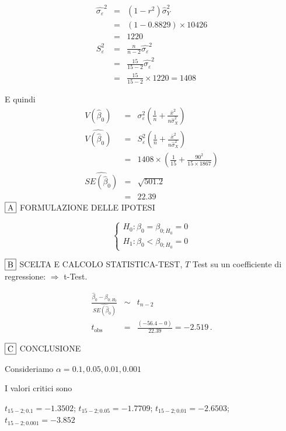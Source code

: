 \documentclass[
  11pt,
]{book}
\theoremstyle{mytheoremstyle}
\theoremstyle{mydefstyle}
\newenvironment{sol}
  {
  \begin{tcolorbox}[enhanced,breakable,arc=0.1mm,boxrule=1pt,colback=white,colframe=iblue,
  title=\bf \fontfamily{lmss}\selectfont \hspace{.5 cm} Soluzione,drop fuzzy shadow]

}{
\end{tcolorbox}
  }
\begin{document}
\begin{sol}
\begin{eqnarray*}
\hat{\sigma_\varepsilon}^2&=&(1-r^2)\hat\sigma_Y^2\\
&=& (1- 0.8829 )\times 10426 \\
   &=&  1220 \\
   S_\varepsilon^2 &=& \frac{n} {n-2} \hat{\sigma_\varepsilon}^2\\
   &=&  \frac{ 15 } { 15 -2} \hat{\sigma_\varepsilon}^2 \\
 &=&  \frac{ 15 } { 15 -2} \times  1220  =  1408  
\end{eqnarray*}

E quindi\begin{eqnarray*}
V(\hat\beta_{0}) &=& \sigma_{\varepsilon}^{2} \left( \frac{1} {n}  +  \frac{\bar{x}^{2}} {n \hat{\sigma}^{2}_{X}} \right)\\
\widehat{V(\hat\beta_{0})} &=& S_{\varepsilon}^{2}\left( \frac{1} {n}  +  \frac{\bar{x}^{2}} {n \hat{\sigma}^{2}_{X}} \right)\ \\
 &=&  1408 \times\left( \frac{1} { 15 }  +  \frac{ 90 ^{2}} { 15 \times  1867 } \right)\\
 \widehat{SE(\hat\beta_{0})}        &=&  \sqrt{ 501.2 }\\
 &=&  22.39 
\end{eqnarray*}
\(\fbox{A}\) FORMULAZIONE DELLE IPOTESI

\[\begin{cases}
   H_0: \beta_0 = \beta_{0;H_0}=0 \\
   H_1: \beta_0 < \beta_{0;H_0}=0 
   \end{cases}\]

\(\fbox{B}\) SCELTA E CALCOLO STATISTICA-TEST, \(T\)
Test su un coefficiente di regressione: \(\Rightarrow\) t-Test.

\begin{eqnarray*}
 \frac{\hat\beta_{ 0 } - \beta_{ 0 ;H_0}} {\widehat{SE(\hat\beta_{ 0 })}}&\sim&t_{n-2}\\
   t_{\text{obs}}
&=& \frac{ ( -56.4 -  0 )} { 22.39 }
 =   -2.519 \, .
\end{eqnarray*}

\(\fbox{C}\) CONCLUSIONE

Consideriamo \(\alpha=0.1, 0.05, 0.01, 0.001\)

I valori critici sono

\(t_{15-2;0.1}=-1.3502\); \(t_{15-2;0.05}=-1.7709\); \(t_{15-2;0.01}=-2.6503\); \(t_{15-2;0.001}=-3.852\)


\end{sol}
\end{document}
